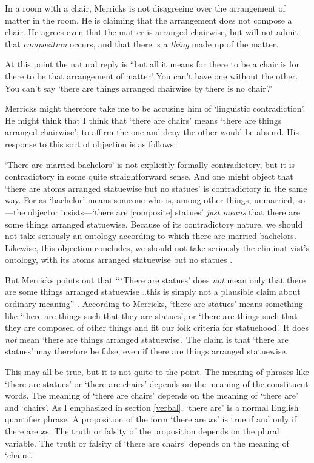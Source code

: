 \documentclass[11pt]{article}
\newenvironment{squote}{%
\begin{spacing}{1}
       	\begin{list}{}{%
\setlength{\labelwidth}{0pt}%
\rightmargin\leftmargin%
}
\item\relax
}{%
\end{list}%
\end{spacing}
}
\begin{document}
\begin{spacing}{1.25}
In a room with a chair, Merricks is not disagreeing over the
arrangement of matter in the room.  He is claiming that the
arrangement does not compose a chair.  He agrees even that the matter
is arranged chairwise, but will not admit that {\em composition}
occurs, and that there is a {\em thing} made up of the matter.

At this point the natural reply is ``but all it means for there to be
a chair is for there to be that arrangement of matter!  You can't have
one without the other.  You can't say `there are things arranged
chairwise by there is no chair'.''

Merricks might therefore take me to be accusing him of `linguistic
contradiction'.  He might think that I think that `there are chairs'
means `there are things arranged chairwise'; to affirm the one and
deny the other would be absurd.  His response to this sort of
objection is as follows:

\begin{squote}
`There are married bachelors' is not explicitly formally
  contradictory, but it is contradictory in some quite straightforward
  sense.  And one might object that `there are atoms arranged
  statuewise but no statues' is contradictory in the same way.  For as
  `bachelor' means someone who is, among other things, unmarried,
  so---the objector insists---`there are [composite] statues' {\em
    just means} that there are some things arranged statuewise.
  Because of its contradictory nature, we should not take seriously an
  ontology according to which there are married bachelors.  Likewise,
  this objection concludes, we should not take seriously the
  eliminativist's ontology, with its atoms arranged statuewise but no
  statues \citeyearpar[13]{merricks2001a}.
\end{squote}

But Merricks points out that ``\,`There are statues' does {\em not}
mean only that there are some things arranged statuewise\,\ldots this
is simply not a plausible claim about ordinary meaning''
\citeyearpar[13]{merricks2001a}.  According to Merricks, `there are
statues' means something like `there are things such that they are
statues', or `there are things such that they are composed of other
things and fit our folk criteria for statuehood'.  It does {\em not}
mean `there are things arranged statuewise'.  The claim is that `there
are statues' may therefore be false, even if there are things arranged
statuewise.

This may all be true, but it is not quite to the point.  The meaning
of phrases like `there are statues' or `there are chairs' depends on
the meaning of the constituent words.  The meaning of `there are
chairs' depends on the meaning of `there are' and `chairs'.  As I
emphasized in section \ref{verbal}, `there are' is a normal English
quantifier phrase.  A proposition of the form `there are $x$s' is true
if and only if there are $x$s.  The truth or falsity of the
proposition depends on the plural variable.  The truth or falsity of
`there are chairs' depends on the meaning of `chairs'.


\end{spacing}
\end{document}
